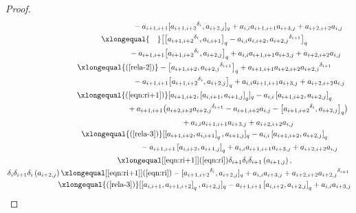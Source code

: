 \documentclass[pdftex]{sigma}
\numberwithin{equation}{section}
\def\lr#1{\left[#1\right]}
\def\lrb#1{\left(#1\right)}
\def\d{\delta}
\begin{document}
\begin{proof}
\begin{gather*}
 \phantom{ \d_i\d_{i+1}\d_i\lrb{a_{i+1,j}}\xlongequal{\qquad}\!\!}{} -a_{i+1,i+1}[ {a_{i+1,i+2}}^{\d_{i}}, a_{i+2,j}]_q +a_{i,i}a_{i+1,i+1}a_{i+3,j}+a_{i+2,i+2}a_{i,j}\\
 \phantom{ \d_i\d_{i+1}\d_i\lrb{a_{i+1,j}}}{} \xlongequal{\quad}
\bigl[\bigl[{a_{i+1,i+2}}^{\d_{i}}, a_{i,i+1}\bigr]_q -a_{i,i}a_{i,i+2}, {a_{i+2,j}}^{\d_{i+1}}\bigr]_q \\
 \phantom{ \d_i\d_{i+1}\d_i\lrb{a_{i+1,j}}\xlongequal{\quad}}{} -a_{i+1,i+1}\bigl[{a_{i+1,i+2}}^{\d_{i}}, a_{i+2,j}\bigr]_q +a_{i,i}a_{i+1,i+1}a_{i+3,j}+a_{i+2,i+2}a_{i,j}\\
 \phantom{ \d_i\d_{i+1}\d_i\lrb{a_{i+1,j}}}{}\xlongequal{\lrb{\ref{rela-2}}} -\bigl[a_{i+1,i+2}, {a_{i+2,j}}^{\d_{i+1}}\bigr]_q +a_{i+1,i+1}a_{i+2,i+2}{a_{i+2,j}}^{\d_{i+1}} \\
 \phantom{ \d_i\d_{i+1}\d_i\lrb{a_{i+1,j}}\xlongequal{\qquad}}{} -a_{i+1,i+1}\bigl[{a_{i+1,i+2}}^{\d_{i}}, a_{i+2,j}\bigr]_q +a_{i,i}a_{i+1,i+1}a_{i+3,j}+a_{i+2,i+2}a_{i,j}\\
 \phantom{ \d_i\d_{i+1}\d_i\lrb{a_{i+1,j}}}{} \xlongequal{\lrb{\ref{eqn:ri+1}}} [a_{i+1,i+2},\lr{a_{i,i+1}, a_{i+1,j}}_q]_q -a_{i,i}\lr{a_{i+1,i+2}, a_{i+2,j}}_q \\
 \phantom{ \d_i\d_{i+1}\d_i\lrb{a_{i+1,j}}\xlongequal{\qquad}\!\!}{} +a_{i+1,i+1} \bigl(a_{i+2,i+2}{a_{i+2,j}}^{\d_{i+1}}-a_{i+1,i+2}a_{i,j}-\bigl[{a_{i+1,i+2}}^{\d_{i}}, a_{i+2,j}\bigr]_q \bigr) \\
 \phantom{ \d_i\d_{i+1}\d_i\lrb{a_{i+1,j}}\xlongequal{\qquad}\!\!}{} +a_{i,i}a_{i+1,i+1}a_{i+3,j}+a_{i+2,i+2}a_{i,j}\\
 \phantom{ \d_i\d_{i+1}\d_i\lrb{a_{i+1,j}}}{} \xlongequal{\lrb{\ref{rela-3}}} [\lr{a_{i+1,i+2}, a_{i,i+1}}_q, a_{i+1,j}]_q -a_{i,i}\lr{a_{i+1,i+2}, a_{i+2,j}}_q \\
 \phantom{ \d_i\d_{i+1}\d_i\lrb{a_{i+1,j}}\xlongequal{\qquad}}{} - a_{i+1,i+1}\lr{a_{i,i+2}, a_{i+1,j}}_q +a_{i,i}a_{i+1,i+1}a_{i+3,j}+a_{i+2,i+2}a_{i,j}\\
 \phantom{ \d_i\d_{i+1}\d_i\lrb{a_{i+1,j}}}{} \xlongequal[\eqref{eqn:ri+1}]{\lrb{\ref{eqn:ri}}} \d_{i+1}\d_i\d_{i+1}\lrb{a_{i+1,j}},\\
 \d_i\d_{i+1}\d_i\lrb{a_{i+2,j}}
\xlongequal[\eqref{eqn:ri+1}]{\lrb{\ref{eqn:ri}}} -[{a_{i+1,i+2}}^{\d_{i}}, a_{i+2,j}]_q+a_{i,i}a_{i+3,j}+a_{i+2,i+2}{a_{i+2,j}}^{\d_{i+1}}\\
 \phantom{ \d_i\d_{i+1}\d_i\lrb{a_{i+2,j}}}{}\xlongequal{\lrb{\ref{rela-3}}} [\lr{a_{i,i+1}, a_{i+1,i+2}}_q, a_{i+2,j}]_q -a_{i+1,i+1}\lr{a_{i,i+2}, a_{i+2,j}}_q +a_{i,i}a_{i+3,j} \\

\end{gather*}
\end{proof}
\end{document}
